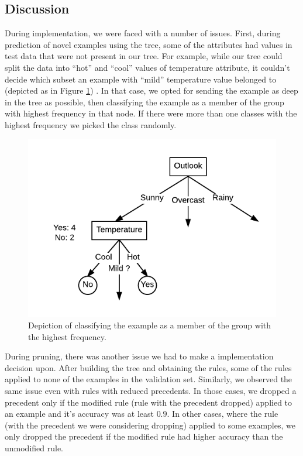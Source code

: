 \documentclass[12pt]{article}
\begin{document}
\subsection{Discussion}\label{discussion}
During implementation, we were faced with a number of issues. First,
during prediction of novel examples using the tree, some of the
attributes had values in test data that were not present in our
tree. For example, while our tree could split the data into ``hot''
and ``cool'' values of temperature attribute, it couldn't decide which
subset an example with ``mild'' temperature value belonged to
(depicted as in Figure \ref{fig:majority-vote}) . In that case, we
opted for sending the example as deep in the tree as possible, then
classifying the example as a member of the group with highest
frequency in that node. If there were more than one classes with the
highest frequency we picked the class randomly.

\begin{figure}[H]
  \centering
  \includegraphics[scale=0.5]{img/majority_voting}
  \caption{Depiction of classifying the example as a member of the group with the highest frequency.}
  \label{fig:majority-vote}
\end{figure}

During pruning, there was another issue we had to make a
implementation decision upon. After building the tree and obtaining
the rules, some of the rules applied to none of the examples in the
validation set. Similarly, we observed the same issue even with rules
with reduced precedents. In those cases, we dropped a precedent only
if the modified rule (rule with the precedent dropped) applied to an
example and it's accuracy was at least $0.9$. In other cases, where the
rule (with the precedent we were considering dropping) applied to some
examples, we only dropped the precedent if the modified rule had
higher accuracy than the unmodified rule.
\end{document}
